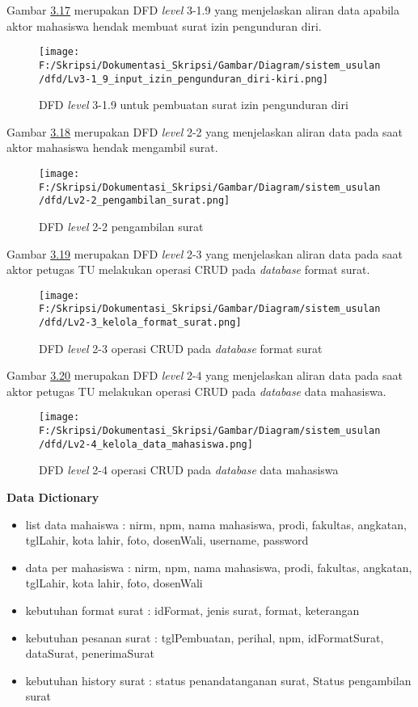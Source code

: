 Gambar \hyperlink{level_3-1.9}{3.17} merupakan DFD \textit{level} 3-1.9 yang menjelaskan aliran data apabila aktor mahasiswa hendak membuat surat izin pengunduran diri.
\begin{figure}[H]
	\centering
		\texttt{[image: F:/Skripsi/Dokumentasi\_Skripsi/Gambar/Diagram/sistem\_usulan/dfd/Lv3-1\_9\_input\_izin\_pengunduran\_diri-kiri.png]}
	\caption{DFD \textit{level} 3-1.9 untuk pembuatan surat izin pengunduran diri}
	\label{fig:level_3-1.9}
\end{figure}

Gambar \hyperlink{level_2-2}{3.18} merupakan DFD \textit{level} 2-2 yang menjelaskan aliran data pada saat aktor mahasiswa hendak mengambil surat.

\begin{figure}[H]
	\centering
		\texttt{[image: F:/Skripsi/Dokumentasi\_Skripsi/Gambar/Diagram/sistem\_usulan/dfd/Lv2-2\_pengambilan\_surat.png]}
	\caption{DFD \textit{level} 2-2 pengambilan surat}
	\label{fig:level_2-2}
\end{figure}

Gambar \hyperlink{level_2-3}{3.19} merupakan DFD \textit{level} 2-3 yang menjelaskan aliran data pada saat aktor petugas TU melakukan operasi CRUD pada \textit{database} format surat.

\begin{figure}[H]
	\centering
		\texttt{[image: F:/Skripsi/Dokumentasi\_Skripsi/Gambar/Diagram/sistem\_usulan/dfd/Lv2-3\_kelola\_format\_surat.png]}
	\caption{DFD \textit{level} 2-3 operasi CRUD pada \textit{database} format surat}
	\label{fig:level_2-3}
\end{figure}

Gambar \hyperlink{level_2-4}{3.20} merupakan DFD \textit{level} 2-4 yang menjelaskan aliran data pada saat aktor petugas TU melakukan operasi CRUD pada \textit{database} data mahasiswa.

\begin{figure}[H]
	\centering
		\texttt{[image: F:/Skripsi/Dokumentasi\_Skripsi/Gambar/Diagram/sistem\_usulan/dfd/Lv2-4\_kelola\_data\_mahasiswa.png]}
	\caption{DFD \textit{level} 2-4 operasi CRUD pada \textit{database} data mahasiswa}
	\label{fig:level_2-4}
\end{figure}

\textbf{Data Dictionary}\\
\begin{itemize}
 \item list data mahaiswa : nirm, npm, nama mahasiswa, prodi, fakultas, angkatan, tglLahir, kota lahir, foto, dosenWali, username, password
 \item data per mahasiswa : nirm, npm, nama mahasiswa, prodi, fakultas, angkatan, tglLahir, kota lahir, foto, dosenWali
 \item kebutuhan format surat : idFormat, jenis surat, format, keterangan
 \item kebutuhan pesanan surat : tglPembuatan, perihal, npm, idFormatSurat, dataSurat, penerimaSurat
 \item kebutuhan history surat : status penandatanganan surat, Status pengambilan surat
\end{itemize}

